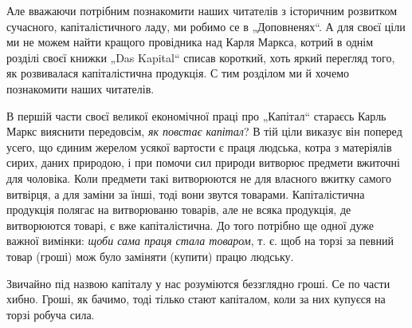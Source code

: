 Але вважаючи потрібним познакомити наших читателів з історичним розвитком сучасного, капіталістичного ладу, ми робимо се в „Доповненях“. А для своєї ціли ми не можем найти кращого провідника над Карля Маркса, котрий в однім розділі своєї книжки „Das Kapital“ списав короткий, хоть яркий перегляд того, як розвивалася капіталістична продукція. С тим розділом ми й хочемо познакомити наших читателів.

\disablefootnotebreak{}

В першій
\enablefootnotebreak{}
части своєї великої економічної праці про „Капітал“ стараєсь Карль Маркс вияснити передовсім, \emph{як повстає капітал}? В тій ціли виказує він поперед усего, що єдиним жерелом усякої вартости є праця людська, котра з матеріялів сирих, даних природою, і при помочи сил природи витворює предмети вжиточні для чоловіка. Коли предмети такі витворюются не для власного вжитку самого витвірця, а для заміни за їнші, тоді вони звутся товарами. Капіталістична продукція полягає на витворюваню товарів, але не всяка продукція, де витворюются товарі, є вже капіталістична. До того потрібно ще одної дуже важної вимінки: \emph{щоби сама праця стала товаром}, т. є. щоб на торзі за певний товар (гроші) мож було заміняти (купити) працю людську.

Звичайно під назвою капіталу у нас розуміются беззглядно гроші. Се по части хибно. Гроші, як бачимо, тоді тілько стают капіталом, коли за них купуєся на торзі робуча сила.


